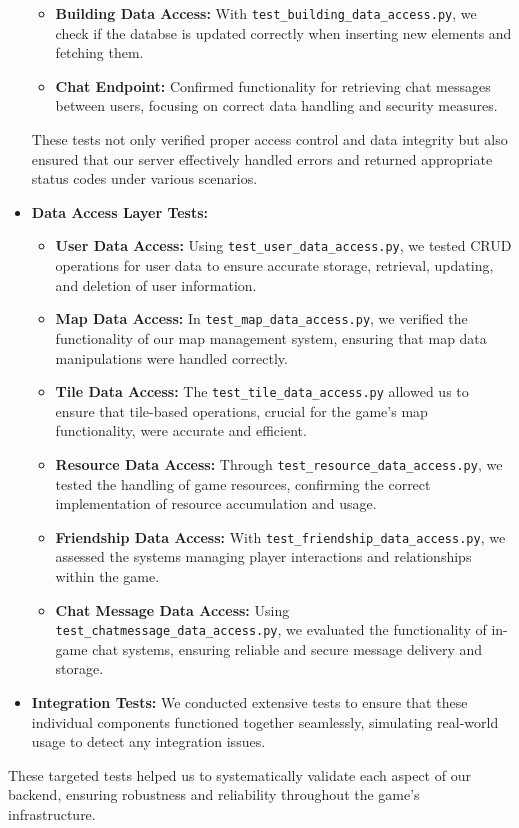\documentclass[12pt]{article}
\begin{document}
\begin{itemize}
\begin{itemize}
            \item \textbf{Building Data Access:} With \texttt{test\_building\_data\_access.py}, we check if the databse is updated correctly when inserting new elements and fetching them.
            \item \textbf{Chat Endpoint:} Confirmed functionality for retrieving chat messages between users, focusing on correct data handling and security measures.
        \end{itemize}
    These tests not only verified proper access control and data integrity but also ensured that our server effectively handled errors and returned appropriate status codes under various scenarios.
    \item \textbf{Data Access Layer Tests:}
    \begin{itemize}
        \item \textbf{User Data Access:} Using \texttt{test\_user\_data\_access.py}, we tested CRUD operations for user data to ensure accurate storage, retrieval, updating, and deletion of user information.
        \item \textbf{Map Data Access:} In \texttt{test\_map\_data\_access.py}, we verified the functionality of our map management system, ensuring that map data manipulations were handled correctly.
        \item \textbf{Tile Data Access:} The \texttt{test\_tile\_data\_access.py} allowed us to ensure that tile-based operations, crucial for the game's map functionality, were accurate and efficient.
        \item \textbf{Resource Data Access:} Through \texttt{test\_resource\_data\_access.py}, we tested the handling of game resources, confirming the correct implementation of resource accumulation and usage.
        \item \textbf{Friendship Data Access:} With \texttt{test\_friendship\_data\_access.py}, we assessed the systems managing player interactions and relationships within the game.
        \item \textbf{Chat Message Data Access:} Using \texttt{test\_chatmessage\_data\_access.py}, we evaluated the functionality of in-game chat systems, ensuring reliable and secure message delivery and storage.
    \end{itemize}
    \item \textbf{Integration Tests:} We conducted extensive tests to ensure that these individual components functioned together seamlessly, simulating real-world usage to detect any integration issues.
\end{itemize}
These targeted tests helped us to systematically validate each aspect of our backend, ensuring robustness and reliability throughout the game's infrastructure.
\end{document}
